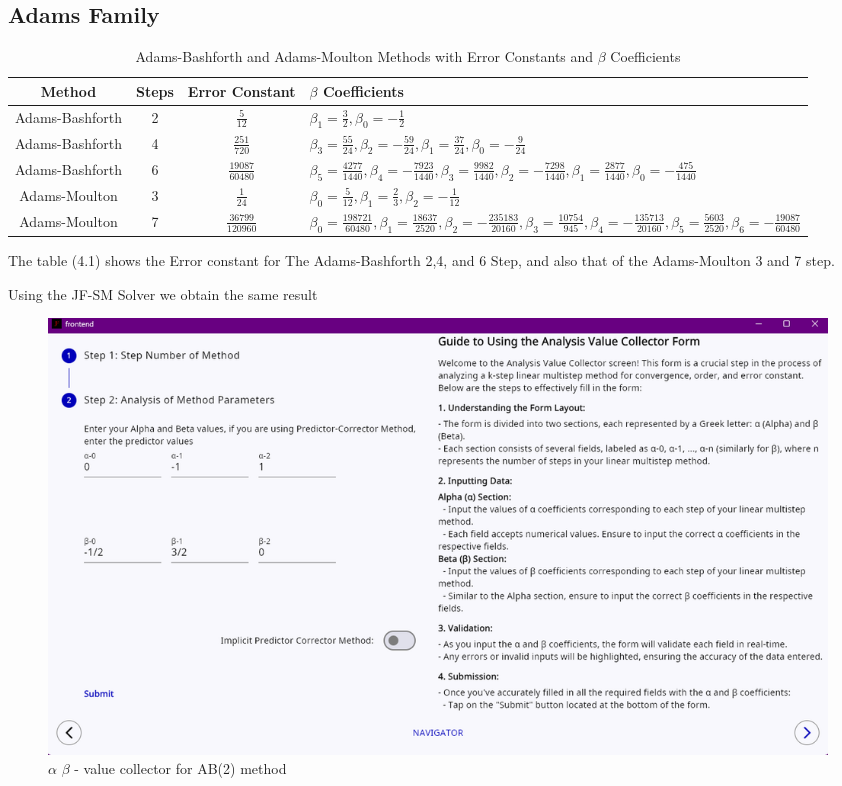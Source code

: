 \subsection{Adams Family}
\begin{table}[h!]
    \centering
    \begin{tabularx}{\textwidth}{|c|c|c|X|}
    \hline
    \textbf{Method} & \textbf{Steps} & \textbf{Error Constant} & \textbf{$\beta$ Coefficients} \\
    \hline
    Adams-Bashforth & 2 & $\frac{5}{12}$ & $\beta_1 = \frac{3}{2}, \beta_0 = -\frac{1}{2}$ \\
    \hline
    Adams-Bashforth & 4 & $\frac{251}{720}$ & $\beta_3 = \frac{55}{24}, \beta_2 = -\frac{59}{24}, \beta_1 = \frac{37}{24}, \beta_0 = -\frac{9}{24}$ \\
    \hline
    Adams-Bashforth & 6 & $\frac{19087}{60480}$ & $\beta_5 = \frac{4277}{1440}, \beta_4 = -\frac{7923}{1440}, \beta_3 = \frac{9982}{1440}, \beta_2 = -\frac{7298}{1440}, \beta_1 = \frac{2877}{1440}, \beta_0 = -\frac{475}{1440}$ \\
    \hline
    Adams-Moulton & 3 & $\frac{1}{24}$ & $\beta_0 = \frac{5}{12}, \beta_1 = \frac{2}{3}, \beta_2 = -\frac{1}{12}$ \\
    \hline
    Adams-Moulton & 7 & $\frac{36799}{120960}$ & $\beta_0 = \frac{198721}{60480}, \beta_1 = \frac{18637}{2520}, \beta_2 = -\frac{235183}{20160}, \beta_3 = \frac{10754}{945}, \beta_4 = -\frac{135713}{20160}, \beta_5 = \frac{5603}{2520}, \beta_6 = -\frac{19087}{60480}$ \\
    \hline
    \end{tabularx}
    \caption{Adams-Bashforth and Adams-Moulton Methods with Error Constants and $\beta$ Coefficients}
    \label{table:adams_methods}
    \end{table}
The table (4.1) shows the Error constant for The Adams-Bashforth 2,4, and 6 Step, and also that of the Adams-Moulton 3 and 7 step.

Using the JF-SM Solver we obtain the same result

\begin{figure}[htbp]
    \centering
    \includegraphics[width=1\textwidth]{chapters/4/image/ab(2)a.png}
    \caption{$\alpha$ $\beta$ - value collector for AB(2) method}
\end{figure}


